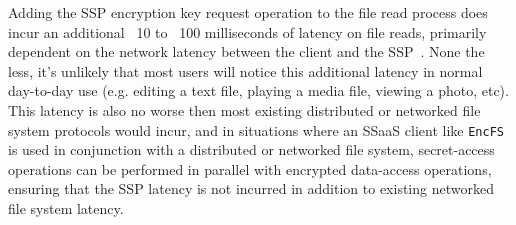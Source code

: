 Adding the SSP encryption key request operation to the file read
process does incur an additional ~10 to ~100 milliseconds of latency
on file reads, primarily dependent on the network latency between the
client and the SSP~\cite{custos-trios}. None the less, it's unlikely
that most users will notice this additional latency in normal
day-to-day use (e.g. editing a text file, playing a media file,
viewing a photo, etc). This latency is also no worse then most
existing distributed or networked file system protocols would incur,
and in situations where an SSaaS client like \texttt{EncFS} is used in
conjunction with a distributed or networked file system, secret-access
operations can be performed in parallel with encrypted data-access
operations, ensuring that the SSP latency is not incurred in addition
to existing networked file system latency.

